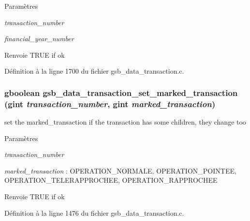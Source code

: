 \begin{DoxyParams}{Paramètres}
\item[{\em transaction\_\-number}]\item[{\em financial\_\-year\_\-number}]\end{DoxyParams}
\begin{DoxyReturn}{Renvoie}
TRUE if ok 
\end{DoxyReturn}


Définition à la ligne 1700 du fichier gsb\_\-data\_\-transaction.c.

\subsubsection[{gsb\_\-data\_\-transaction\_\-set\_\-marked\_\-transaction}]{\setlength{\rightskip}{0pt plus 5cm}gboolean gsb\_\-data\_\-transaction\_\-set\_\-marked\_\-transaction (gint {\em transaction\_\-number}, \/  gint {\em marked\_\-transaction})}\label{gsb__data__transaction_8h_ad6f2f1403737959c3aee7059b7115399}
set the marked\_\-transaction if the transaction has some children, they change too


\begin{DoxyParams}{Paramètres}
\item[{\em transaction\_\-number}]\item[{\em marked\_\-transaction}]: OPERATION\_\-NORMALE, OPERATION\_\-POINTEE, OPERATION\_\-TELERAPPROCHEE, OPERATION\_\-RAPPROCHEE\end{DoxyParams}
\begin{DoxyReturn}{Renvoie}
TRUE if ok 
\end{DoxyReturn}


Définition à la ligne 1476 du fichier gsb\_\-data\_\-transaction.c.

